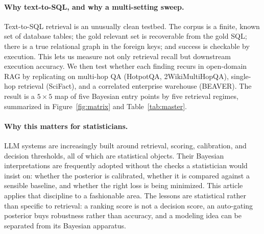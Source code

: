 \documentclass[11pt]{article}
\begin{document}
\paragraph{Why text-to-SQL, and why a multi-setting sweep.} Text-to-SQL retrieval is an unusually clean
testbed. The corpus is a finite, known set of database tables; the gold relevant set is recoverable
from the gold SQL; there is a true relational graph in the foreign keys; and success is checkable by
execution. This lets us measure not only retrieval recall but downstream execution accuracy. We then
test whether each finding recurs in open-domain RAG by replicating on multi-hop QA (HotpotQA,
2WikiMultiHopQA), single-hop retrieval (SciFact), and a correlated enterprise warehouse (BEAVER). The
result is a $5\times5$ map of five Bayesian entry points by five retrieval regimes, summarized in
Figure~\ref{fig:matrix} and Table~\ref{tab:master}.

\paragraph{Why this matters for statisticians.} LLM systems are increasingly built around retrieval,
scoring, calibration, and decision thresholds, all of which are statistical objects. Their Bayesian
interpretations are frequently adopted without the checks a statistician would insist on: whether the
posterior is calibrated, whether it is compared against a sensible baseline, and whether the right loss
is being minimized. This article applies that discipline to a fashionable area. The lessons are
statistical rather than specific to retrieval: a ranking score is not a decision score, an auto-gating
posterior buys robustness rather than accuracy, and a modeling idea can be separated from its Bayesian
apparatus.
\end{document}
